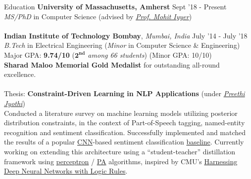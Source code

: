 \documentclass{resume} %
\begin{document}
\vspace*{-1mm}
\begin{rSection}{Education}
{\bf University of Massachusetts, Amherst} \hfill {Sept '18 - Present} \\ \textit{MS/PhD} in Computer Science (advised by \textit{\href{https://people.cs.umass.edu/~miyyer/}{Prof. Mohit Iyyer}}) \\\\
{\bf Indian Institute of Technology Bombay}, \textit{Mumbai, India} \hfill {July '14 - July '18} \\ 
\textit{B.Tech} in Electrical Engineering (\textit{Minor} in Computer Science \& Engineering)\\
Major GPA: \textbf{9.74/10} (\textit{$\mathbf{2^{nd}}$ among 66 students}) (Minor GPA: 10/10)\\
\textbf{Sharad Maloo Memorial Gold Medalist} for outstanding all-round excellence. \\\\
Thesis: \textbf{Constraint-Driven Learning in NLP Applications} (under \textit{\href{https://www.cse.iitb.ac.in/~pjyothi/}{Preethi Jyothi}}) \\
Conducted a literature survey on machine learning models utilizing posterior distribution constraints, in the context of Part-of-Speech tagging, named-entity recognition and sentiment classification. Successfully implemented and matched the results of a popular \href{https://en.wikipedia.org/wiki/Convolutional_neural_network}{CNN}-based sentiment classification \href{https://arxiv.org/abs/1408.5882}{baseline}. Currently working on extending this architecture using a ``student-teacher'' distillation framework using \href{http://www.cs.columbia.edu/~mcollins/papers/tagperc.pdf}{perceptron} / \href{http://jmlr.csail.mit.edu/papers/volume7/crammer06a/crammer06a.pdf}{PA} algorithms, inspired by CMU's \href{https://arxiv.org/pdf/1603.06318.pdf}{Harnessing Deep Neural Networks with Logic Rules}.
\end{rSection}
\end{document}
